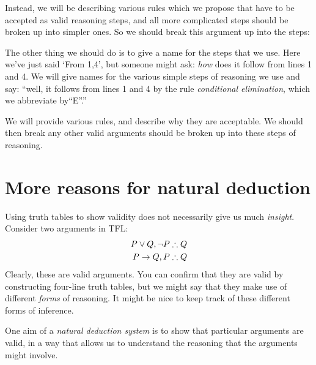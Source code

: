 Instead, we will be describing various rules which we propose that have to be accepted as valid reasoning steps, and all more complicated steps should be broken up into simpler ones. So we should break this argument up into the steps:
 \begin{fitchproof}
 \end{fitchproof}

The other thing we should do is to give a name for the steps that we use. Here we've just said `From 1,4', but someone might ask: \emph{how} does it follow from lines 1 and 4. We will give names for the various simple steps of reasoning we use and say: ``well, it follows from lines 1 and 4 by the rule \emph{conditional elimination}, which we abbreviate by``\eif E''.''
 \begin{fitchproof}
 \end{fitchproof}

We will provide various rules, and describe why they are acceptable. We should then break any other valid arguments should be broken up into these steps of reasoning.



\section{More reasons for natural deduction}


Using truth tables to show validity does not necessarily give us much \emph{insight}. Consider two arguments in TFL:
	\begin{align*}
		P \eor Q, \enot P & \therefore Q\\
		P \eif Q, P & \therefore Q
	\end{align*}
Clearly, these are valid arguments. You can confirm that they are valid by constructing four-line truth tables, but we might say that they make use of different \emph{forms} of reasoning. It might be nice to keep track of these different forms of inference.

One aim of a \emph{natural deduction system} is to show that particular arguments are valid, in a way that allows us to understand the reasoning that the arguments might involve.

